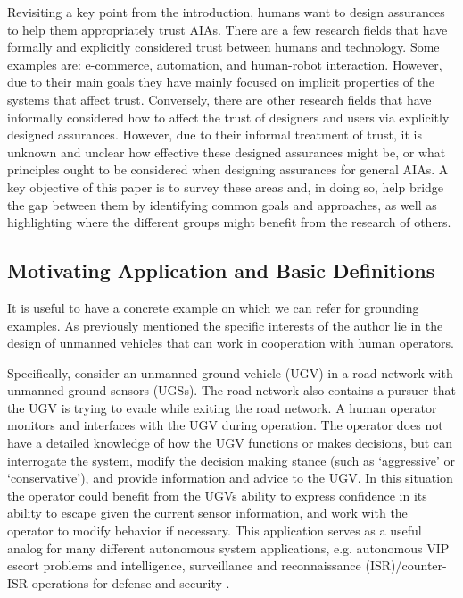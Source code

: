     Revisiting a key point from the introduction, humans want to design assurances to help them appropriately trust AIAs. There are a few research fields that have formally and explicitly considered trust between humans and technology. Some examples are: e-commerce, automation, and human-robot interaction. However, due to their main goals they have mainly focused on implicit properties of the systems that affect trust. Conversely, there are other research fields that have informally considered how to affect the trust of designers and users via explicitly designed assurances. However, due to their informal treatment of trust, it is unknown and unclear how effective these designed assurances might be, or what principles ought to be considered when designing assurances for general AIAs. A key objective of this paper is to survey these areas and, in doing so, help bridge the gap between them by identifying common goals and approaches, as well as highlighting where the different groups might benefit from the research of others.

\subsection{Motivating Application and Basic Definitions} \label{sec:mot_example}
    It is useful to have a concrete example on which we can refer for grounding examples. As previously mentioned the specific interests of the author lie in the design of unmanned vehicles that can work in cooperation with human operators.

    Specifically, consider an unmanned ground vehicle (UGV) in a road network with unmanned ground sensors (UGSs). The road network also contains a pursuer that the UGV is trying to evade while exiting the road network. A human operator monitors and interfaces with the UGV during operation. The operator does not have a detailed knowledge of how the UGV functions or makes decisions, but can interrogate the system, modify the decision making stance (such as `aggressive' or `conservative'), and provide information and advice to the UGV. In this situation the operator could benefit from the UGVs ability to express confidence in its ability to escape given the current sensor information, and work with the operator to modify behavior if necessary. This application serves as a useful analog for many different autonomous system applications, e.g. autonomous VIP escort problems and intelligence, surveillance and reconnaissance (ISR)/counter-ISR operations for defense and security \cite{Kingston2012-va}.
   
